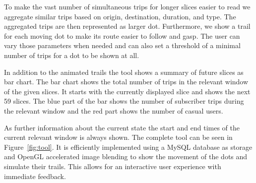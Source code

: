 To make the vast number of simultaneous trips for longer slices
easier to read we aggregate similar trips based on origin, destination,
duration, and type. The aggregated trips are then represented as larger
dot.
Furthermore, we show a trail for each moving dot to make its
route easier to follow and gasp.
The user can vary those parameters when needed and can also
set a threshold of a minimal number of trips for a dot to be shown at all.

In addition to the animated trails the tool shows a summary of
future slices as bar chart.
The bar chart shows the total number of trips in the relevant window
of the given slices.
It starts with the currently displayed slice and shows the next 59 slices.
The blue part of the bar shows the number of subscriber trips during
the relevant window and the red part shows the number of casual users.

As further information about the current state the start and end times
of the current relevant window is always shown.
The complete tool can be seen in Figure~\ref{fig:tool}.
It is efficiently implemented using a MySQL database as storage and
OpenGL accelerated image blending to show the movement of the dots
and simulate their trails.
This allows for an interactive user experience with immediate feedback.
